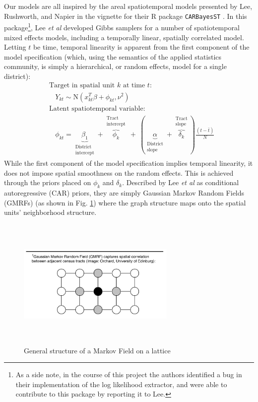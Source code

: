 \documentclass[journal]{IEEEtran}
\begin{document}
Our models are all inspired by the areal spatiotemporal models presented by Lee, Rushworth, and Napier in the vignette for their R package \texttt{CARBayesST} \cite{lee2015carbayesst}. In this package\footnote{As a side note, in the course of this project the authors identified a bug in their implementation of the log likelihood extractor, and were able to contribute to this package by reporting it to Lee.}, Lee \emph{et al} developed Gibbs samplers for a number of spatiotemporal mixed effects models, including a temporally linear, spatially correlated model. Letting $t$ be time, temporal linearity is apparent from the first component of the model specification (which, using the semantics of the applied statistics community, is simply a hierarchical, or random effects, model for a single district):
\begin{align*}
    &\textrm{Target in spatial unit }k\textrm{ at time }t:\\
    &~~~~Y_{kt}\sim \textrm{N}(x_{kt}^T\beta + \phi_{kt},\nu^2)\\
    &\textrm{Latent spatiotemporal variable:}\\
    &~~~~\phi_{kt} = \underbrace{\beta_1}_{\substack{\textrm{District}\\\textrm{intercept}}} + \overbrace{\phi_k}^{\substack{\textrm{Tract}\\\textrm{intercept}}}~+~(\underbrace{\alpha}_{\substack{\textrm{District}\\\textrm{slope}}}+ \overbrace{\delta_k}^{\substack{\textrm{Tract}\\\textrm{slope}}})\frac{(t - \bar{t})}{N}
\end{align*}
While the first component of the model specification implies temporal linearity, it does not impose spatial smoothness on the random effects. This is achieved through the priors placed on $\phi_{k}$ and $\delta_{k}$. Described by Lee \emph{et al} as conditional autoregressive (CAR) priors, they are simply Gaussian Markov Random Fields (GMRFs) (as shown in Fig. \ref{fig:MRF}) where the graph structure maps onto the spatial units' neighborhood structure.

\begin{figure}[!h]
    \centering
    \includegraphics[width=3in,height=2.5in,clip,keepaspectratio]{MRF.png}
    \caption{General structure of a Markov Field on a lattice}
    \label{fig:MRF}
\end{figure}
\end{document}
